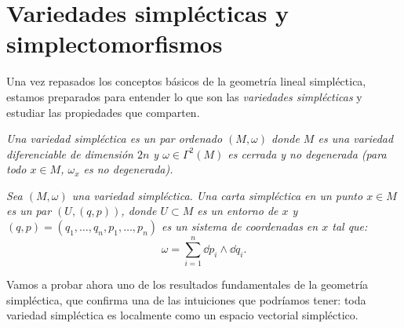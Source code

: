 \section{Variedades simplécticas y simplectomorfismos}\label{sec:variedades}
Una vez repasados los conceptos básicos de la geometría lineal simpléctica, estamos preparados para entender lo que son las \emph{variedades simplécticas} y estudiar las propiedades que comparten.
\begin{defn}
  \em
  Una \emph{variedad simpléctica} es un par ordenado $(M,\omega)$ donde $M$ es una variedad diferenciable de dimensión $2n$ y $\omega \in \Gamma^2(M)$ es cerrada y no degenerada (para todo $x \in M$, $\omega_x$ es no degenerada). 
\end{defn}
\begin{defn}
  \em
  Sea $(M,\omega)$ una variedad simpléctica. Una \emph{carta simpléctica en un punto $x \in M$} es un par $(U,(q,p))$, donde $U\subset M$ es un entorno de $x$ y $(q,p)=(q_1,\dots,q_n,p_1,\dots,p_n)$ es un sistema de coordenadas en $x$ tal que:
\begin{equation*}
  \omega= \sum_{i=1}^n \dd p_i \wedge \dd q_i.
\end{equation*}
\end{defn}

Vamos a probar ahora uno de los resultados fundamentales de la geometría simpléctica, que confirma una de las intuiciones que podríamos tener: toda variedad simpléctica es localmente como un espacio vectorial simpléctico.

